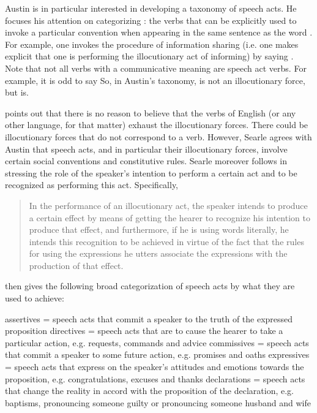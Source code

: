 Austin is in particular interested in developing a taxonomy of speech acts. He focuses his attention on categorizing : the verbs that can be explicitly used to invoke a particular convention when appearing in the same sentence as the word . For example, one invokes the procedure of information sharing (i.e. one makes explicit that one is performing the illocutionary act of informing) by saying . Note that not all verbs with a communicative meaning are speech act verbs. For example, it is odd to say  So, in Austin's taxonomy,  is not an illocutionary force, but  is.

\textcite{searle1969} points out that there is no reason to believe that the verbs of English (or any other language, for that matter) exhaust the illocutionary forces. There could be illocutionary forces that do not correspond to a verb. However, Searle agrees with Austin that speech acts, and in particular their illocutionary forces, involve certain social conventions and constitutive rules. Searle moreover follows \textcite{grice1957meaning} in stressing the role of the speaker’s intention to perform a certain act and to be recognized as performing this act. Specifically, %

\begin{quote}
In the performance of an illocutionary act, the speaker intends to produce a certain effect by means of getting the hearer to recognize his intention to produce that effect, and furthermore, if he is using words literally, he intends this recognition to be achieved in virtue of the fact that the rules for using the expressions he utters associate the expressions with the production of that effect.\\
\hspace*{\fill} \hfill \cite[259]{searle1969}
\end{quote}

\textcite{searle1976class} then gives the following broad categorization of speech acts by what they are used to achieve:

\bxl
assertives = speech acts that commit a speaker to the truth of the expressed proposition
\ex directives = speech acts that are to cause the hearer to take a particular action, e.g. requests, commands and advice
\ex commissives = speech acts that commit a speaker to some future action, e.g. promises and oaths
\ex expressives = speech acts that express on the speaker's attitudes and emotions towards the proposition, e.g. congratulations, excuses and thanks
\ex declarations = speech acts that change the reality in accord with the proposition of the declaration, e.g. baptisms, pronouncing someone guilty or pronouncing someone husband and wife
\exl
\eex

